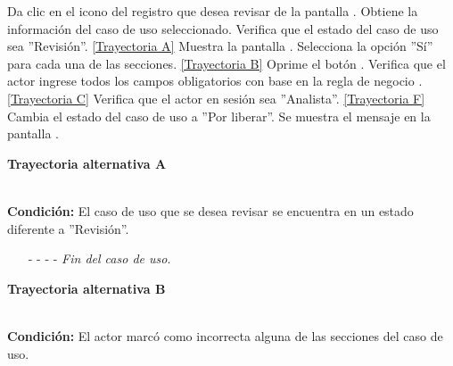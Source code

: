	\begin{UCtrayectoria}
		\UCpaso[\UCactor] Da clic en el icono  del registro que desea revisar de la pantalla .
		\UCpaso[\UCsist] Obtiene la información del caso de uso seleccionado. 
		\UCpaso[\UCsist] Verifica que el estado del caso de uso sea ''Revisión''. \hyperlink{CU12-5:TAA}{[Trayectoria A]}
		\UCpaso[\UCsist] Muestra la pantalla .
		\UCpaso[\UCactor] Selecciona la opción ''Sí'' para cada una de las secciones. \hyperlink{CU12-5:TAB}{[Trayectoria B]} \label{CU12.5-P5}
		\UCpaso[\UCactor] Oprime el botón . \label{CU12.5-P6}
		\UCpaso[\UCsist] Verifica que el actor ingrese todos los campos obligatorios con base en la regla de negocio . \hyperlink{CU12-5:TAC}{[Trayectoria C]}
		\UCpaso[\UCsist] Verifica que el actor en sesión sea ''Analista''. \hyperlink{CU12-5:TAF}{[Trayectoria F]}
		\UCpaso[\UCsist] Cambia el estado del caso de uso a ''Por liberar''.
		\UCpaso[\UCsist] Se muestra el mensaje  en la pantalla . \label{CU12.5-P12}
	\end{UCtrayectoria}		
\hypertarget{CU12-5:TAA}{\textbf{Trayectoria alternativa A}}\\
\noindent \textbf{Condición:} El caso de uso que se desea revisar se encuentra en un estado diferente a ''Revisión''.
\begin{enumerate}
	\UCpaso[\UCsist] Oculta el botón  del caso que no se encuentra en estado de ''Revisión''.
	\item[- -] - - {\em {Fin del caso de uso}}.
\end{enumerate}
\hypertarget{CU12-5:TAB}{\textbf{Trayectoria alternativa B}}\\
\noindent \textbf{Condición:} El actor marcó como incorrecta alguna de las secciones del caso de uso.
